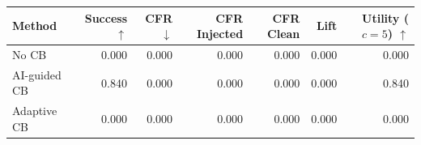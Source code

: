 \begin{tabular}{lrrrrrr}
\toprule
Method & Success $\uparrow$ & CFR $\downarrow$ & CFR Injected & CFR Clean & Lift & Utility ($c=5$) $\uparrow$ \\
\midrule
No CB & 0.000 & 0.000 & 0.000 & 0.000 & 0.000 & 0.000 \\
AI-guided CB & 0.840 & 0.000 & 0.000 & 0.000 & 0.000 & 0.840 \\
Adaptive CB & 0.000 & 0.000 & 0.000 & 0.000 & 0.000 & 0.000 \\
\bottomrule
\end{tabular}
